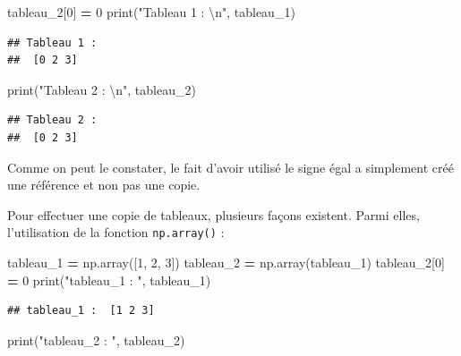 \documentclass[12pt,]{book}
\newenvironment{Shaded}{\begin{snugshade}}{\end{snugshade}}
\newcommand{\DecValTok}[1]{\textcolor[rgb]{0.00,0.00,0.81}{#1}}
\newcommand{\CharTok}[1]{\textcolor[rgb]{0.31,0.60,0.02}{#1}}
\newcommand{\StringTok}[1]{\textcolor[rgb]{0.31,0.60,0.02}{#1}}
\newcommand{\OperatorTok}[1]{\textcolor[rgb]{0.81,0.36,0.00}{\textbf{#1}}}
\newcommand{\BuiltInTok}[1]{#1}
\newcommand{\NormalTok}[1]{#1}
\numberwithin{equation}{section}
\numberwithin{countremarque}{section}
\begin{document}
\begin{Shaded}
\begin{Highlighting}[]
\NormalTok{tableau_2[}\DecValTok{0}\NormalTok{] }\OperatorTok{=} \DecValTok{0}
\BuiltInTok{print}\NormalTok{(}\StringTok{"Tableau 1 : }\CharTok{\textbackslash{}n}\StringTok{"}\NormalTok{, tableau_1)}
\end{Highlighting}
\end{Shaded}

\begin{lstlisting}
## Tableau 1 : 
##  [0 2 3]
\end{lstlisting}

\begin{Shaded}
\begin{Highlighting}[]
\BuiltInTok{print}\NormalTok{(}\StringTok{"Tableau 2 : }\CharTok{\textbackslash{}n}\StringTok{"}\NormalTok{, tableau_2)}
\end{Highlighting}
\end{Shaded}

\begin{lstlisting}
## Tableau 2 : 
##  [0 2 3]
\end{lstlisting}

Comme on peut le constater, le fait d'avoir utilisé le signe égal a
simplement créé une référence et non pas une copie.

Pour effectuer une copie de tableaux, plusieurs façons existent. Parmi
elles, l'utilisation de la fonction \texttt{np.array()} :

\begin{Shaded}
\begin{Highlighting}[]
\NormalTok{tableau_1 }\OperatorTok{=}\NormalTok{ np.array([}\DecValTok{1}\NormalTok{, }\DecValTok{2}\NormalTok{, }\DecValTok{3}\NormalTok{])}
\NormalTok{tableau_2 }\OperatorTok{=}\NormalTok{ np.array(tableau_1)}
\NormalTok{tableau_2[}\DecValTok{0}\NormalTok{] }\OperatorTok{=} \DecValTok{0}
\BuiltInTok{print}\NormalTok{(}\StringTok{"tableau_1 : "}\NormalTok{, tableau_1)}
\end{Highlighting}
\end{Shaded}

\begin{lstlisting}
## tableau_1 :  [1 2 3]
\end{lstlisting}

\begin{Shaded}
\begin{Highlighting}[]
\BuiltInTok{print}\NormalTok{(}\StringTok{"tableau_2 : "}\NormalTok{, tableau_2)}
\end{Highlighting}
\end{Shaded}
\end{document}
